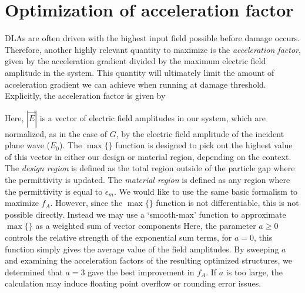 \section{Optimization of acceleration factor}

DLAs are often driven with the highest input field possible before damage occurs.
Therefore, another highly relevant quantity to maximize is the \textit{acceleration factor}, given by the acceleration gradient divided by the maximum electric field amplitude in the system.
This quantity will ultimately limit the amount of acceleration gradient we can achieve when running at damage threshold.
Explicitly, the acceleration factor is given by

%
Here, $|\vec{E}|$ is a vector of electric field amplitudes in our system, which are normalized, as in the case of $G$, by the electric field amplitude of the incident plane wave ($E_0$).
The $\max\{\}$ function is designed to pick out the highest value of this vector in either our design or material region, depending on the context.
The \textit{design region} is defined as the total region outside of the particle gap where the permittivity is updated.
The \textit{material region} is defined as any region where the permittivity is equal to $\epsilon_m$.
We would like to use the same basic formalism to maximize $f_{A}$.
However, since the $\max\{\}$ function is not differentiable, this is not possible directly.
Instead we may use a `smooth-max' function to approximate $\max\{\}$ as a weighted sum of vector components
%
%
Here, the parameter $a \geq 0$ controls the relative strength of the exponential sum terms, for $a = 0$, this function simply gives the average value of the field amplitudes.
By sweeping $a$ and examining the acceleration factors of the resulting optimized structures, we determined that $a = 3$ gave the best improvement in $f_A$.
If $a$ is too large, the calculation may induce floating point overflow or rounding error issues.


